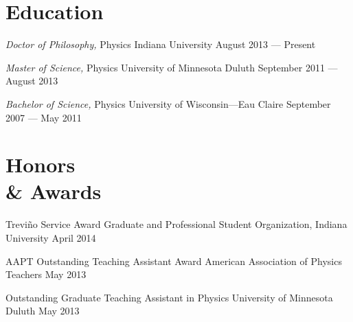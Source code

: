 \documentclass{cv}
\begin{document}
\begin{resume}



% 

% 
% 



\section{Education}

\object
{\emph{Doctor of Philosophy,} Physics}
{Indiana University}
{August 2013 --- Present}


\object
{\emph{Master of Science,} Physics}
{University of Minnesota Duluth}
{September 2011 --- August 2013}


\object
{\emph{Bachelor of Science,} Physics}
{University of Wisconsin---Eau Claire}
{September 2007 --- May 2011}



\section{Honors \\ \& Awards}

\object
{Trevi\~{n}o Service Award}
{Graduate and Professional Student Organization, Indiana University}
{April 2014}


\object
{AAPT Outstanding Teaching Assistant Award}
{American Association of Physics Teachers}
{May 2013}


\object
{Outstanding Graduate Teaching Assistant in Physics}
{University of Minnesota Duluth}
{May 2013}



\end{resume}
\end{document}
